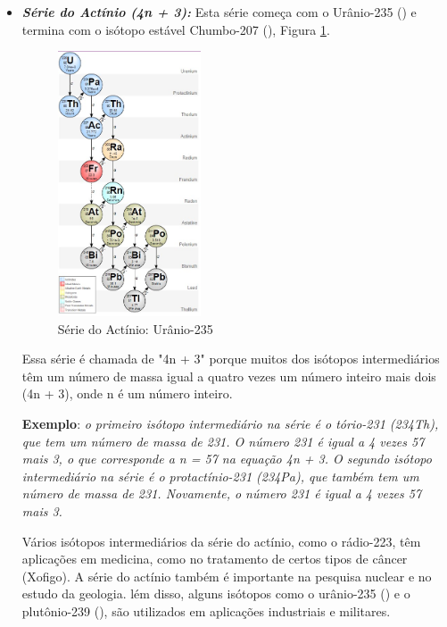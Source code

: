 \documentclass[11pt,a4paper]{article}
\begin{document}
\begin{itemize}
                    \item \textbf{\textit{\textcolor{CarnationPink}{Série do Actínio (4n + 3):}}} Esta série começa com o Urânio-235 () e termina com o isótopo estável Chumbo-207 (), Figura \ref{fig:serieDoActinio}. 
                    
                    
                        \begin{figure}[h]
                            \centering
                            \includegraphics[width=0.4\textwidth]{Imagens/serieDoActinio.jpg}
                            \caption{Série do Actínio: Urânio-235}
                            \label{fig:serieDoActinio}
                        \end{figure}
                    
                        Essa série é chamada de "4n + 3" porque muitos dos isótopos intermediários têm um número de massa igual a quatro vezes um número inteiro mais dois (4n + 3), onde n é um número inteiro.

                        \textbf{Exemplo}: \textit{o primeiro isótopo intermediário na série é o tório-231 (234Th), que tem um número de massa de 231. O número 231 é igual a 4 vezes 57 mais 3, o que corresponde a n = 57 na equação 4n + 3. O segundo isótopo intermediário na série é o protactínio-231 (234Pa), que também tem um número de massa de 231. Novamente, o número 231 é igual a 4 vezes 57 mais 3.}

                        Vários isótopos intermediários da série do actínio, como o rádio-223, têm aplicações em medicina, como no tratamento de certos tipos de câncer (Xofigo). A série do actínio também é importante na pesquisa nuclear e no estudo da geologia. lém disso, alguns isótopos como o urânio-235 () e o plutônio-239 (), são utilizados em aplicações industriais e militares.

                \end{itemize}
                
\end{document}
